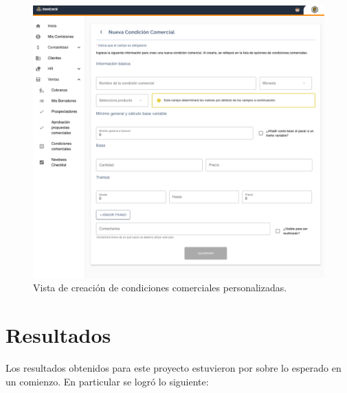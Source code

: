     \begin{figure}[H]
      \centering
      \includegraphics[width=0.6\linewidth]{figures/cc/vistas/cc_new_manager.png}
      \caption{Vista de creación de condiciones comerciales personalizadas.}
      \label{fig:cc_new_manager}
    \end{figure}

\section{Resultados}

  Los resultados obtenidos para este proyecto estuvieron por sobre lo esperado en un comienzo. En particular se logró lo siguiente:

